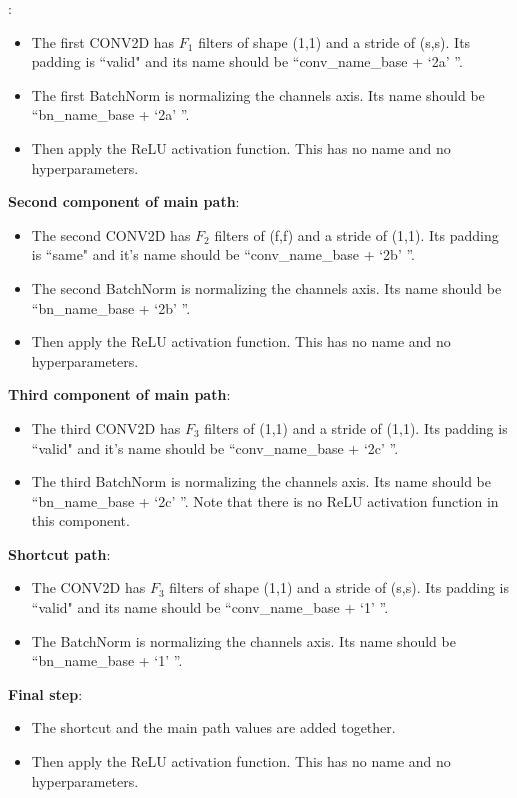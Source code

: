 : 
\begin{itemize}
\item The first CONV2D has $F_1$ filters of shape (1,1) and a stride of (s,s). Its padding is ``valid" and its name should be ``conv\_name\_base + `2a' ''. 
\item The first BatchNorm is normalizing the channels axis.  Its name should be ``bn\_name\_base + `2a' ''.
\item Then apply the ReLU activation function. This has no name and no hyperparameters. 
\end{itemize}
{\textbf{Second component of main path}}:
\begin{itemize}
\item The second CONV2D has $F_2$ filters of (f,f) and a stride of (1,1). Its padding is ``same" and it's name should be ``conv\_name\_base + `2b' ''.
\item The second BatchNorm is normalizing the channels axis.  Its name should be ``bn\_name\_base + `2b' ''.
\item Then apply the ReLU activation function. This has no name and no hyperparameters. 
\end{itemize}
{\textbf{Third component of main path}}:
\begin{itemize}
\item The third CONV2D has $F_3$ filters of (1,1) and a stride of (1,1). Its padding is ``valid" and it's name should be ``conv\_name\_base + `2c' ''.
\item The third BatchNorm is normalizing the channels axis.  Its name should be ``bn\_name\_base + `2c' ''. Note that there is no ReLU activation function in this component. 
\end{itemize}
{\color{red}\textbf{Shortcut path}}:
\begin{itemize}
\item The CONV2D has $F_3$ filters of shape (1,1) and a stride of (s,s). Its padding is ``valid" and its name should be ``conv\_name\_base + `1' ''.
\item The BatchNorm is normalizing the channels axis.  Its name should be ``bn\_name\_base + `1' ''. 
\end{itemize}
{\textbf{Final step}}: 
\begin{itemize}
\item The shortcut and the main path values are added together.
\item Then apply the ReLU activation function. This has no name and no hyperparameters. 
\end{itemize}
